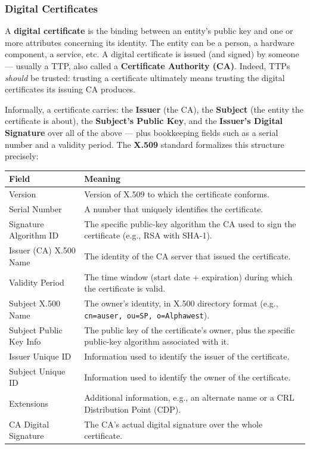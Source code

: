 \documentclass[12pt, a4paper]{article}
\begin{document}
\subsubsection{Digital Certificates}
\label{subsec:certificate-05}
A \textbf{digital certificate} is the binding between an entity's public key and one or more attributes concerning its identity. The entity can be a person, a hardware component, a service, etc. A digital certificate is issued (and signed) by someone --- usually a TTP, also called a \textbf{Certificate Authority (CA)}. Indeed, TTPs \emph{should} be trusted: trusting a certificate ultimately means trusting the digital certificates its issuing CA produces.

Informally, a certificate carries: the \textbf{Issuer} (the CA), the \textbf{Subject} (the entity the certificate is about), the \textbf{Subject's Public Key}, and the \textbf{Issuer's Digital Signature} over all of the above --- plus bookkeeping fields such as a serial number and a validity period. The \textbf{X.509} standard formalizes this structure precisely:

\begin{center}
\small
\begin{tabular}{@{}p{4cm}p{9.5cm}@{}}
\toprule
\textbf{Field} & \textbf{Meaning} \\
\midrule
Version & Version of X.509 to which the certificate conforms. \\
Serial Number & A number that uniquely identifies the certificate. \\
Signature Algorithm ID & The specific public-key algorithm the CA used to sign the certificate (e.g., RSA with SHA-1). \\
Issuer (CA) X.500 Name & The identity of the CA server that issued the certificate. \\
Validity Period & The time window (start date + expiration) during which the certificate is valid. \\
Subject X.500 Name & The owner's identity, in X.500 directory format (e.g., \texttt{cn=auser, ou=SP, o=Alphawest}). \\
Subject Public Key Info & The public key of the certificate's owner, plus the specific public-key algorithm associated with it. \\
Issuer Unique ID & Information used to identify the issuer of the certificate. \\
Subject Unique ID & Information used to identify the owner of the certificate. \\
Extensions & Additional information, e.g., an alternate name or a CRL Distribution Point (CDP). \\
CA Digital Signature & The CA's actual digital signature over the whole certificate. \\
\bottomrule
\end{tabular}
\end{center}
\end{document}
